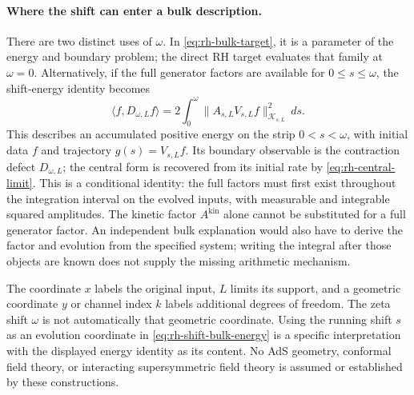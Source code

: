 \paragraph{Where the shift can enter a bulk description.}
There are two distinct uses of $\omega$. In
\eqref{eq:rh-bulk-target}, it is a parameter of the energy and boundary
problem; the direct RH target evaluates that family at $\omega=0$.
Alternatively, if the full generator factors are available for
$0\leq s\leq\omega$, the shift-energy identity becomes
\begin{equation}
\langle f,D_{\omega,L}f\rangle
=2\int_0^\omega
\lVert A_{s,L}V_{s,L}f\rVert_{\mathcal K_{s,L}}^2\,ds .
\label{eq:rh-shift-bulk-energy}
\end{equation}
This describes an accumulated positive energy on the strip
$0<s<\omega$, with initial data $f$ and trajectory
$g(s)=V_{s,L}f$. Its boundary observable is the contraction defect
$D_{\omega,L}$; the central form is recovered from its initial rate
by \eqref{eq:rh-central-limit}. This is a conditional identity: the full factors must first exist
throughout the integration interval on the evolved inputs, with
measurable and integrable squared amplitudes. The kinetic factor
$A^{\mathrm{kin}}$ alone cannot be substituted for a full generator
factor. An independent bulk explanation would also have to derive
the factor and evolution
from the specified system; writing the integral after those objects
are known does not supply the missing arithmetic mechanism.

The coordinate $x$ labels the original input, $L$ limits its support,
and a geometric coordinate $y$ or channel index $k$ labels additional
degrees of freedom. The zeta shift $\omega$ is not automatically that
geometric coordinate. Using the running shift $s$ as an evolution
coordinate in \eqref{eq:rh-shift-bulk-energy} is a specific
interpretation with the displayed energy identity as its content.
No AdS geometry, conformal field theory, or interacting supersymmetric
field theory is assumed or established by these constructions.
